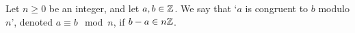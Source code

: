 \documentclass[../Aluffi_Algebra.tex]{subfiles}
\begin{document}
\begin{defn}
    Let \(n \geq 0\) be an integer, and let \(a, b \in \mathbb{Z}\). We say that `\(a\) is congruent to \(b\) modulo \(n\)',
    denoted \(a \equiv b \mod n\), if \(b - a \in n\mathbb{Z}\).
\end{defn}
\end{document}
